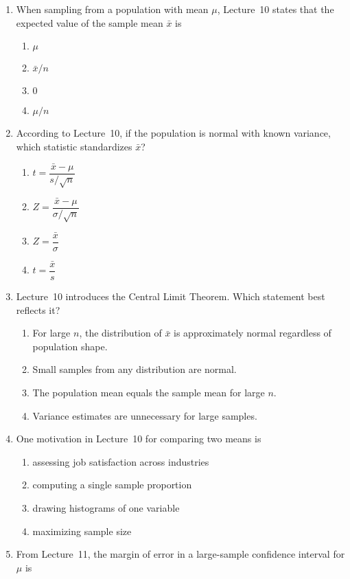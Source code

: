 \documentclass{article}
\begin{document}
\begin{enumerate}
\item When sampling from a population with mean $\mu$, Lecture~10 states that the expected value of the sample mean $\bar{x}$ is
  \begin{enumerate}[label=(\Alph*)]
  \item $\mu$
  \item $\bar{x}/n$
  \item $0$
  \item $\mu/n$
  \end{enumerate}
\item According to Lecture~10, if the population is normal with known variance, which statistic standardizes $\bar{x}$?
  \begin{enumerate}[label=(\Alph*)]
  \item $t=\dfrac{\bar{x}-\mu}{s/\sqrt{n}}$
  \item $Z=\dfrac{\bar{x}-\mu}{\sigma/\sqrt{n}}$
  \item $Z=\dfrac{\bar{x}}{\sigma}$
  \item $t=\dfrac{\bar{x}}{s}$
  \end{enumerate}
\item Lecture~10 introduces the Central Limit Theorem. Which statement best reflects it?
  \begin{enumerate}[label=(\Alph*)]
  \item For large $n$, the distribution of $\bar{x}$ is approximately normal regardless of population shape.
  \item Small samples from any distribution are normal.
  \item The population mean equals the sample mean for large $n$.
  \item Variance estimates are unnecessary for large samples.
  \end{enumerate}
\item One motivation in Lecture~10 for comparing two means is
  \begin{enumerate}[label=(\Alph*)]
  \item assessing job satisfaction across industries
  \item computing a single sample proportion
  \item drawing histograms of one variable
  \item maximizing sample size
  \end{enumerate}
\item From Lecture~11, the margin of error in a large-sample confidence interval for $\mu$ is

\end{enumerate}
\end{document}
